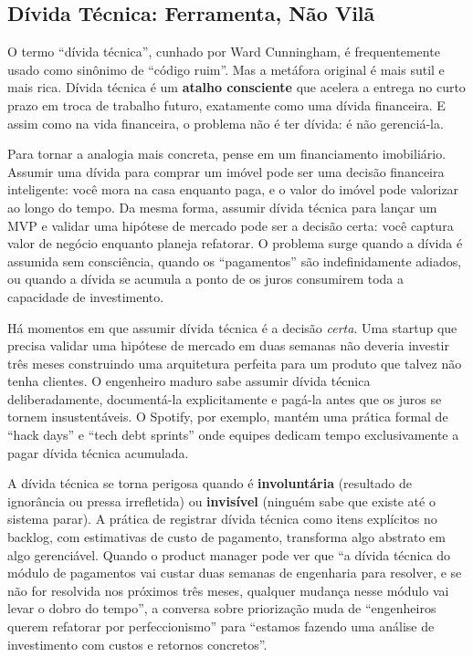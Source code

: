 \subsection{Dívida Técnica: Ferramenta, Não Vilã}

O termo ``dívida técnica'', cunhado por Ward Cunningham, é frequentemente
usado como sinônimo de ``código ruim''. Mas a metáfora original é mais
sutil e mais rica. Dívida técnica é um \textbf{atalho consciente} que
acelera a entrega no curto prazo em troca de trabalho futuro, exatamente
como uma dívida financeira. E assim como na vida financeira, o problema
não é ter dívida: é não gerenciá-la.

Para tornar a analogia mais concreta, pense em um financiamento
imobiliário. Assumir uma dívida para comprar um imóvel pode ser uma
decisão financeira inteligente: você mora na casa enquanto paga, e o
valor do imóvel pode valorizar ao longo do tempo. Da mesma forma, assumir
dívida técnica para lançar um MVP e validar uma hipótese de mercado pode
ser a decisão certa: você captura valor de negócio enquanto planeja
refatorar. O problema surge quando a dívida é assumida sem consciência,
quando os ``pagamentos'' são indefinidamente adiados, ou quando a dívida
se acumula a ponto de os juros consumirem toda a capacidade de
investimento.

Há momentos em que assumir dívida técnica é a decisão \emph{certa}. Uma
startup que precisa validar uma hipótese de mercado em duas semanas não
deveria investir três meses construindo uma arquitetura perfeita para um
produto que talvez não tenha clientes. O engenheiro maduro sabe assumir
dívida técnica deliberadamente, documentá-la explicitamente e pagá-la
antes que os juros se tornem insustentáveis. O Spotify, por exemplo,
mantém uma prática formal de ``hack days'' e ``tech debt sprints'' onde
equipes dedicam tempo exclusivamente a pagar dívida técnica acumulada.

A dívida técnica se torna perigosa quando é \textbf{involuntária}
(resultado de ignorância ou pressa irrefletida) ou \textbf{invisível}
(ninguém sabe que existe até o sistema parar). A prática de registrar
dívida técnica como itens explícitos no backlog, com estimativas de
custo de pagamento, transforma algo abstrato em algo gerenciável. Quando
o product manager pode ver que ``a dívida técnica do módulo de
pagamentos vai custar duas semanas de engenharia para resolver, e se
não for resolvida nos próximos três meses, qualquer mudança nesse
módulo vai levar o dobro do tempo'', a conversa sobre priorização muda
de ``engenheiros querem refatorar por perfeccionismo'' para ``estamos
fazendo uma análise de investimento com custos e retornos concretos''.

